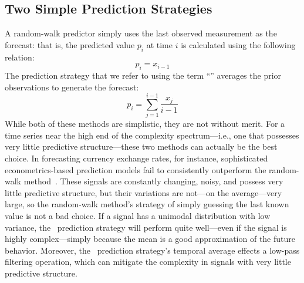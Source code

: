 
\subsection{Two Simple Prediction Strategies}
\label{sec:simple}

A random-walk predictor simply uses the last observed measurement as
the forecast: that is, the predicted value $p_i$ at time $i$ is
calculated using the following relation: $$p_i = x_{i-1}$$ The
prediction strategy that we refer to using the term ``\naive''
averages the prior observations to generate the forecast: $$p_i =
\sum_{j=1}^{i-1}\frac{x_j}{i-1}$$ While both of these methods are
simplistic, they are not without merit.  For a time series near the
high end of the complexity spectrum---i.e., one that possesses very
little predictive structure---these two methods can actually be the
best choice.  In forecasting currency exchange rates, for instance,
sophisticated econometrics-based prediction models fail to
consistently outperform the random-walk method~\cite{rwMeese,rwCCE}.
These signals are constantly changing, noisy, and possess very little
predictive structure, but their variations are not---on the
average---very large, so the random-walk method's strategy of simply
guessing the last known value is not a bad choice.  If a signal has a
unimodal distribution with low variance, the \naive ~prediction
strategy will perform quite well---even if the signal is highly
complex---simply because the mean is a good approximation of the
future behavior.  Moreover, the \naive ~prediction strategy's temporal
average effects a low-pass filtering operation, which can  mitigate the
complexity in signals with very little predictive structure.

